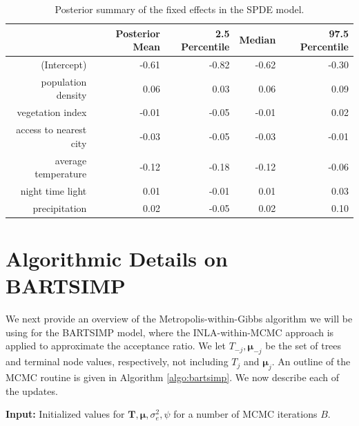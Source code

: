 \documentclass{article}
\begin{document}
\begin{table}[H]
\label{tab:spat}
\centering
\begin{tabular}{rrrrr}
  \hline
 & Posterior Mean & 2.5 Percentile & Median & 97.5 Percentile \\ 
  \hline
(Intercept) & -0.61 & -0.82 & -0.62 & -0.30 \\ 
 population density & 0.06 & 0.03 & 0.06 & 0.09 \\ 
  vegetation index & -0.01 & -0.05 & -0.01 & 0.02 \\ 
  access to nearest city & -0.03 & -0.05 & -0.03 & -0.01 \\ 
  average temperature  & -0.12 & -0.18 & -0.12 & -0.06 \\ 
  night time light & 0.01 & -0.01 & 0.01 & 0.03 \\ 
  precipitation & 0.02 & -0.05 & 0.02 & 0.10 \\ 
   \hline
\end{tabular}
\caption{Posterior summary of the fixed effects in the SPDE model.}
\end{table}

\newpage

\section{Algorithmic Details on BARTSIMP}

We next provide an overview of the Metropolis-within-Gibbs algorithm we will be using for the BARTSIMP model, where the INLA-within-MCMC approach is applied to approximate the acceptance ratio.  We let $T_{-j}, \boldsymbol{\mu}_{-j}$  be the set of trees and terminal node values, respectively, not including $T_j$ and $\boldsymbol{\mu}_j$. An outline of the MCMC routine is given in Algorithm \ref{algo:bartsimp}. We now describe each of the updates.
\begin{algorithm}[!htb]
\SetAlgoLined
\textbf{Input:} Initialized values for $\mathbf{T}, \boldsymbol{\mu}, \sigma_e^2, \psi$ for a number of MCMC iterations $B$. \\
 \caption{An overview of the BARTSIMP algorithm.}
 \label{algo:bartsimp}
\end{algorithm}\\
\end{document}
